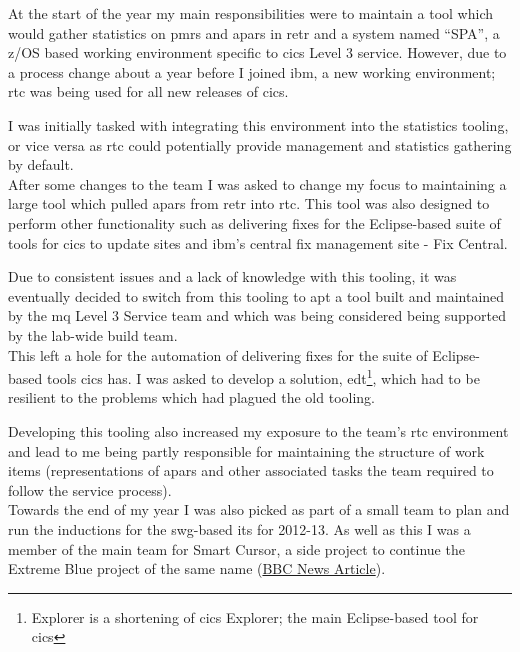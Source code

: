 \documentclass[a4paper,11pt]{report}
\begin{document}
At the start of the year my main responsibilities were to maintain a tool which would gather 
statistics on \gls{pmr}s and \gls{apar}s in \gls{retr} and a system named ``SPA'', a z/OS based
working environment specific to \gls{cics} Level 3 service. However, due to a process change about
a year before I joined \gls{ibm}, a new working environment; \gls{rtc} was being used for all new
releases of \gls{cics}.

I was initially tasked with integrating this environment into the 
statistics tooling, or vice versa as \gls{rtc} could potentially provide management and statistics
gathering by default. \\



After some changes to the team I was asked to change my focus to maintaining a large tool which
pulled \gls{apar}s from \gls{retr} into \gls{rtc}. This tool was also designed to perform other
functionality such as delivering fixes for the Eclipse-based suite of tools for \gls{cics} to
update sites and \gls{ibm}'s central fix management site - Fix Central.

Due to consistent issues and a lack of knowledge with this tooling, it was eventually decided to
switch from this tooling to \gls{apt} a tool built and maintained by the \gls{mq} Level 3 Service 
team and which was being considered being supported by the lab-wide build team. \\



This left a hole for the automation of delivering fixes for the suite of Eclipse-based tools 
\gls{cics} has. I was asked to develop a solution, \gls{edt}\footnote{Explorer is a shortening of 
\gls{cics} Explorer; the main Eclipse-based tool for \gls{cics}}, which had to be resilient to the
problems which had plagued the old tooling.

Developing this tooling also increased my exposure to the team's \gls{rtc} environment and lead to
me being partly responsible for maintaining the structure of work items (representations of 
\gls{apar}s and other associated tasks the team required to follow the service process). \\



Towards the end of my year I was also picked as part of a small team to plan and run the inductions
for the \gls{swg}-based \gls{it}s for 2012-13. As well as this I was a member of the main team for
Smart Cursor, a side project to continue the Extreme Blue project of the same name
(\href{http://www.bbc.co.uk/news/technology-14859157}{BBC News Article}).
\end{document}
